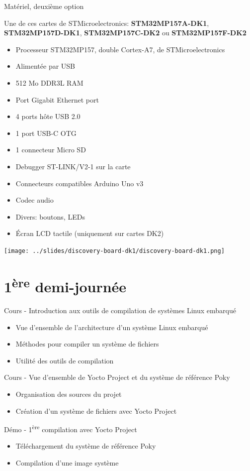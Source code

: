 \documentclass[a4paper,12pt,obeyspaces,spaces,hyphens]{article}
\begin{document}
\feagendatwocolumn
{Matériel, deuxième option}
{
  Une de ces cartes de STMicroelectronics: {\bf
  STM32MP157A-DK1}, {\bf STM32MP157D-DK1}, {\bf STM32MP157C-DK2} ou
  {\bf STM32MP157F-DK2}
  \begin{itemize}
  \item Processeur STM32MP157, double Cortex-A7, de STMicroelectronics
  \item Alimentée par USB
  \item 512 Mo DDR3L RAM
  \item Port Gigabit Ethernet port
  \item 4 ports hôte USB 2.0
  \item 1 port USB-C OTG
  \item 1 connecteur Micro SD
  \item Debugger ST-LINK/V2-1 sur la carte
  \item Connecteurs compatibles Arduino Uno v3
  \item Codec audio
  \item Divers: boutons, LEDs
  \item Écran LCD tactile (uniquement sur cartes DK2)
  \end{itemize}
}{}
{
  \begin{center}
    \texttt{[image: ../slides/discovery-board-dk1/discovery-board-dk1.png]}
  \end{center}
}

\section{1\textsuperscript{ère} demi-journée}

\feagendaonecolumn
{Cours - Introduction aux outils de compilation de systèmes Linux embarqué}
{
  \begin{itemize}
  \item Vue d'ensemble de l'architecture d'un système Linux embarqué
  \item Méthodes pour compiler un système de fichiers
  \item Utilité des outils de compilation
  \end{itemize}
}

\feagendatwocolumn
{Cours - Vue d'ensemble de Yocto Project et du système de référence Poky}
{
  \begin{itemize}
  \item Organisation des sources du projet
  \item Création d'un système de fichiers avec Yocto Project
  \end{itemize}
}
{Démo - 1\textsuperscript{ère} compilation avec Yocto Project}
{
  \begin{itemize}
  \item Téléchargement du système de référence Poky
  \item Compilation d'une image système
 \end{itemize}
}
\end{document}
